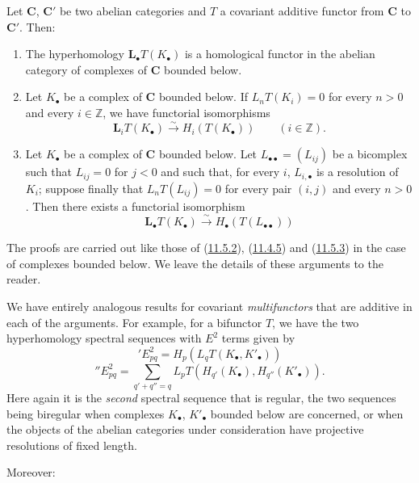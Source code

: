 \begin{proposition}[11.6.3]
\label{0.11.6.3}
Let $\boldsymbol{C}$, $\boldsymbol{C}'$ be two abelian categories and $T$ a covariant
additive functor from $\boldsymbol{C}$ to $\boldsymbol{C}'$. Then:
\begin{enumerate}
\item[{\rm(i)}] {The hyperhomology $\mathbf{L}_\bullet T(K_\bullet)$ is a
homological functor in the abelian category of complexes of
$\boldsymbol{C}$ bounded below.}
\item[{\rm(ii)}] {Let $K_\bullet$ be a complex of $\boldsymbol{C}$ bounded
below. If $L_nT(K_i)=0$ for every $n>0$ and every $i\in\mathbb Z$, we
have functorial isomorphisms}
\[
\label{0.11.6.3.1}
\tag{11.6.3.1}
\mathbf{L}_iT(K_\bullet)\xrightarrow{\sim} H_i(T(K_\bullet))\qquad(i\in\mathbb Z).
\]
\item[{\rm(iii)}] {Let $K_\bullet$ be a complex of $\boldsymbol{C}$ bounded
below. Let $L_{\bullet\bullet}=(L_{ij})$ be a bicomplex such that
$L_{ij}=0$ for $j<0$ and such that, for every $i$, $L_{i,\bullet}$ is a
resolution of $K_i$; suppose finally that $L_nT(L_{ij})=0$ for every pair
$(i,j)$ and every $n>0$. Then there exists a functorial isomorphism}
\[
\label{0.11.6.3.2}
\tag{11.6.3.2}
\mathbf{L}_\bullet T(K_\bullet)\xrightarrow{\sim} H_\bullet(T(L_{\bullet\bullet}))
\]
\end{enumerate}
\upshape The proofs are carried out like those of
\textup{(\hyperref[0.11.5.2]{11.5.2})}, \textup{(\hyperref[0.11.4.5]{11.4.5})} and
\textup{(\hyperref[0.11.5.3]{11.5.3})} in the case of complexes bounded
below. We leave the details of these arguments to the reader.
\end{proposition}

\begin{env}[11.6.4]
\label{0.11.6.4}
We have entirely analogous results for covariant \emph{multifunctors} that are
additive in each of the arguments. For example, for a bifunctor $T$, we have
the two hyperhomology spectral sequences with $E^2$ terms given by
\[
\label{0.11.6.4.1}
\tag{11.6.4.1}
{}'E^2_{pq}=H_p(L_qT(K_\bullet,K'_\bullet))
\]
\[
\label{0.11.6.4.2}
\tag{11.6.4.2}
{}''E^2_{pq}=
\sum_{q'+q''=q}L_pT(H_{q'}(K_\bullet),H_{q''}(K'_\bullet)).
\]
Here again it is the \emph{second} spectral sequence that is regular, the two
sequences being biregular when complexes $K_\bullet$,
$K'_\bullet$ bounded below are concerned, or when the objects of the abelian
categories under consideration have projective resolutions of fixed
length.

Moreover:
\end{env}


